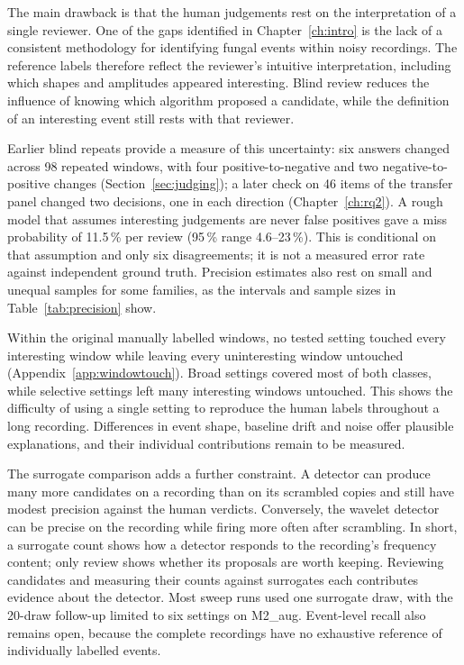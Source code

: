 The main drawback is that the human judgements rest on the interpretation of a single reviewer. One of the gaps identified in Chapter~\ref{ch:intro} is the lack of a consistent methodology for identifying fungal events within noisy recordings. The reference labels therefore reflect the reviewer's intuitive interpretation, including which shapes and amplitudes appeared interesting. Blind review reduces the influence of knowing which algorithm proposed a candidate, while the definition of an interesting event still rests with that reviewer.

Earlier blind repeats provide a measure of this uncertainty: six answers changed across 98 repeated windows, with four positive-to-negative and two negative-to-positive changes (Section~\ref{sec:judging}); a later check on 46 items of the transfer panel changed two decisions, one in each direction (Chapter~\ref{ch:rq2}). A rough model that assumes interesting judgements are never false positives gave a miss probability of 11.5\,\% per review (95\,\% range 4.6--23\,\%). This is conditional on that assumption and only six disagreements; it is not a measured error rate against independent ground truth. Precision estimates also rest on small and unequal samples for some families, as the intervals and sample sizes in Table~\ref{tab:precision} show.

Within the original manually labelled windows, no tested setting touched every interesting window while leaving every uninteresting window untouched (Appendix~\ref{app:windowtouch}). Broad settings covered most of both classes, while selective settings left many interesting windows untouched. This shows the difficulty of using a single setting to reproduce the human labels throughout a long recording. Differences in event shape, baseline drift and noise offer plausible explanations, and their individual contributions remain to be measured.

The surrogate comparison adds a further constraint. A detector can produce many more candidates on a recording than on its scrambled copies and still have modest precision against the human verdicts. Conversely, the wavelet detector can be precise on the recording while firing more often after scrambling. In short, a surrogate count shows how a detector responds to the recording's frequency content; only review shows whether its proposals are worth keeping. Reviewing candidates and measuring their counts against surrogates each contributes evidence about the detector. Most sweep runs used one surrogate draw, with the 20-draw follow-up limited to six settings on M2\_aug. Event-level recall also remains open, because the complete recordings have no exhaustive reference of individually labelled events.

